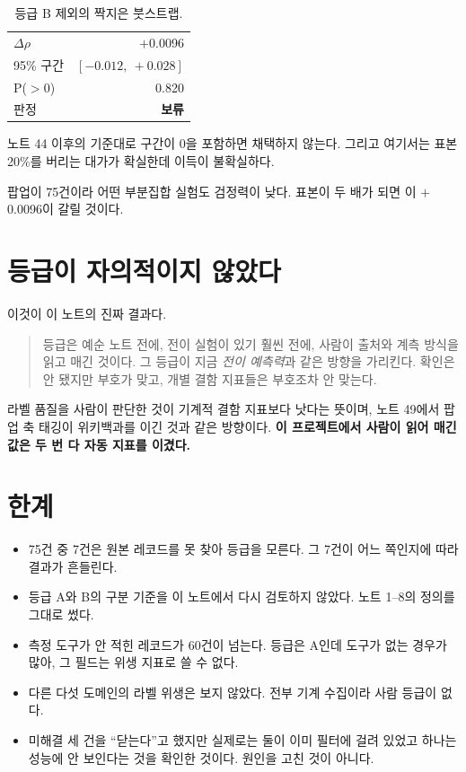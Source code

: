 \documentclass[10pt]{article}
\begin{document}
\begin{table}[t]
\centering\tsize
\caption{등급 B 제외의 짝지은 붓스트랩.}
\begin{tabular}{lr}
\toprule
$\Delta\rho$ & $+$0.0096 \\
95\% 구간 & $[-0.012,\ +0.028]$ \\
P($>$0) & 0.820 \\
\midrule
판정 & \textbf{보류} \\
\bottomrule
\end{tabular}
\end{table}

노트 44 이후의 기준대로 구간이 0을 포함하면 채택하지 않는다. 그리고 여기서는
표본 20\%를 버리는 대가가 확실한데 이득이 불확실하다.

{팝업이 75건이라 어떤 부분집합 실험도 검정력이 낮다. 표본이 두 배가 되면 이
$+$0.0096이 갈릴 것이다.}

\section{등급이 자의적이지 않았다}

이것이 이 노트의 진짜 결과다.

\begin{quote}\fontsize{9.5}{11.5}\selectfont
등급은 예순 노트 전에, 전이 실험이 있기 훨씬 전에, 사람이 출처와 계측 방식을
읽고 매긴 것이다. 그 등급이 지금 \emph{전이 예측력}과 같은 방향을 가리킨다.
확인은 안 됐지만 부호가 맞고, 개별 결함 지표들은 부호조차 안 맞는다.
\end{quote}

라벨 품질을 사람이 판단한 것이 기계적 결함 지표보다 낫다는 뜻이며, 노트 49에서
팝업 축 태깅이 위키백과를 이긴 것과 같은 방향이다. \textbf{이 프로젝트에서
사람이 읽어 매긴 값은 두 번 다 자동 지표를 이겼다.}

\section{한계}

\begin{itemize}[leftmargin=1.1em,itemsep=0.15em]
\item 75건 중 7건은 원본 레코드를 못 찾아 등급을 모른다. 그 7건이 어느 쪽인지에
      따라 결과가 흔들린다.
\item 등급 A와 B의 구분 기준을 이 노트에서 다시 검토하지 않았다. 노트 1--8의
      정의를 그대로 썼다.
\item 측정 도구가 안 적힌 레코드가 60건이 넘는다. 등급은 A인데 도구가 없는
      경우가 많아, 그 필드는 위생 지표로 쓸 수 없다.
\item 다른 다섯 도메인의 라벨 위생은 보지 않았다. 전부 기계 수집이라 사람
      등급이 없다.
\item 미해결 세 건을 ``닫는다''고 했지만 실제로는 둘이 이미 필터에 걸려 있었고
      하나는 성능에 안 보인다는 것을 확인한 것이다. 원인을 고친 것이 아니다.
\end{itemize}
\end{document}
